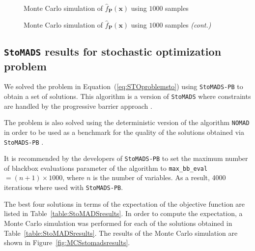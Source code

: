 \begin{figure}[h!]
	\centering
	
	\caption[]{Monte Carlo simulation of $\hat{f}_{\mathbf{P}}(\mathbf{x})$ using $1000$ samples}
\end{figure}

\begin{figure}[h!]
	\ContinuedFloat %
	\caption[Monte Carlo simulation of $\hat{f}_{\mathbf{P}}(\mathbf{x})$ using $1000$ samples]{Monte Carlo simulation of $\hat{f}_{\mathbf{P}}(\mathbf{x})$ using $1000$ samples \emph{(cont.)}}
	\label{fig:MSCStoblackbox}
\end{figure}

\subsection{\texttt{StoMADS} results for stochastic optimization problem} \label{subsec:STOMADSresults}

We solved the problem in Equation~(\ref{eq:STOproblemsto}) using \texttt{StoMADS-PB} to obtain a set of solutions. This algorithm is a version of \texttt{StoMADS} where constraints are handled by the progressive barrier approach \cite{Audet2009}.

The problem is also solved using the deterministic version of the algorithm \texttt{NOMAD} in order to be used as a benchmark for the quality of the solutions obtained via \texttt{StoMADS-PB} \cite{LeDigabel2011}. 

It is recommended by the developers of \texttt{StoMADS-PB} to set the maximum number of blackbox evaluations parameter of the algorithm to \texttt{max\_bb\_eval}$ = (n+1) \times 1000$, where $n$ is the number of variables. As a result, 4000 iterations where used with \texttt{StoMADS-PB}.

The best four solutions in terms of the expectation of the objective function are listed in Table~\ref{table:StoMADSresults}. In order to compute the expectation, a Monte Carlo simulation was performed for each of the solutions obtained in Table~\ref{table:StoMADSresults}. The results of the Monte Carlo simulation are shown in Figure~\ref{fig:MCSstomadsresults}.

